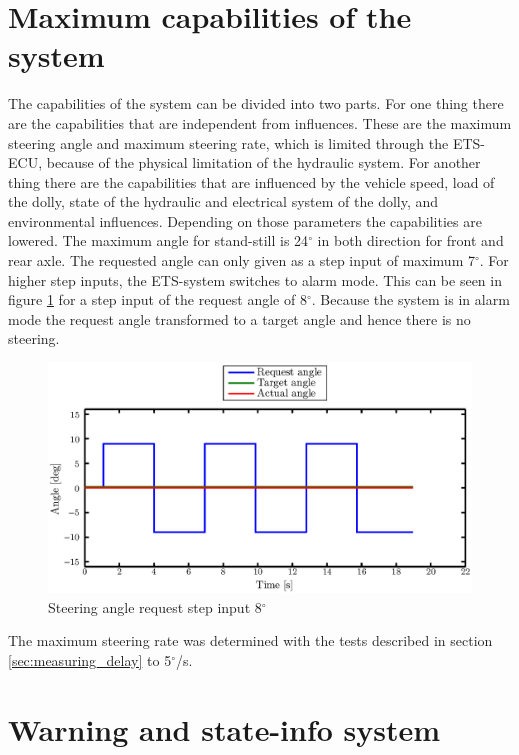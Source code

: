 \documentclass[ExampleMasters.tex]{subfiles}
\begin{document}
\section{Maximum capabilities of the system}
\label{sec:maxi_capabilities}
The capabilities of the system can be divided into two parts. For one thing there are the capabilities that are independent from influences. These are the maximum steering angle and maximum steering rate, which is limited through the \gls{ETS}-\gls{ECU}, because of the physical limitation of the hydraulic system.
For another thing there are the capabilities that are influenced by the vehicle speed, load of the dolly, state of the hydraulic and electrical system of the dolly, and environmental influences.
Depending on those parameters the capabilities are lowered.
The maximum angle for stand-still is 24$^\circ$ in both direction for front and rear axle. 
The requested angle can only given as a step input of maximum 7$^\circ$. For higher step inputs, the \gls{ETS}-system switches to alarm mode. This can be seen in figure \ref{fig:max_step_input} for a step input of the request angle of 8$^\circ$. Because the system is in alarm mode the request angle transformed to a target angle and hence there is no steering.
\begin{figure}[!hbt]
	\centering
	\includegraphics[width=1\linewidth]{figures/step_input_8deg}
	\caption{Steering angle request step input 8$^\circ$}
	
	\label{fig:max_step_input}
\end{figure}  
The maximum steering rate was determined with the tests described in section \ref{sec:measuring_delay} to 5$^\circ$/s.

\section{Warning and state-info system}
\label{sec:warning_system}
\end{document}
